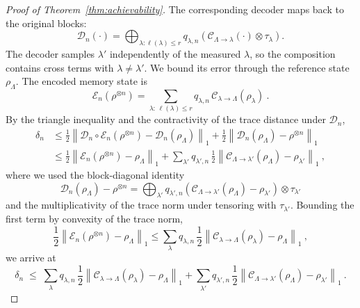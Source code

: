 \documentclass[a4paper,onecolumn,11pt]{quantumarticle}
\def\map{\mathcal}
\begin{document}
\begin{proof}[Proof of Theorem~\ref{thm:achievability}]
The corresponding decoder maps back to the original blocks:
\begin{equation}\label{eq:optimal_decoder}
    \map{D}_n(\cdot) = \bigoplus_{\lambda : \ell(\lambda) \le r}
    q_{\lambda,n}\left(\map{C}_{\Lambda\to \lambda}(\cdot)
    \otimes\tau_\lambda\right).
\end{equation}
The decoder samples $\lambda'$ independently of the measured $\lambda$,
so the composition contains cross terms with $\lambda\ne\lambda'$.
We bound its error through the reference state $\rho_{\Lambda}$.
The encoded memory state is
\begin{equation}
    \map E_n(\rho^{\otimes n})=\sum_{\lambda:\,\ell(\lambda)\le r} q_{\lambda,n}\,\map C_{\lambda\to\Lambda}(\rho_\lambda)\ .
\end{equation}
By the triangle inequality and the contractivity of the trace distance under $\map D_n$,
\begin{equation}
\begin{aligned}
    \delta_n &\le \frac12\left\|\map D_n\circ\map E_n(\rho^{\otimes n})-\map D_n(\rho_{\Lambda})\right\|_1 + \frac12\left\|\map D_n(\rho_{\Lambda})-\rho^{\otimes n}\right\|_1\\
    &\le \frac12\left\|\map E_n(\rho^{\otimes n})-\rho_{\Lambda}\right\|_1 + \sum_{\lambda'}q_{\lambda',n}\,\frac12\left\|\map C_{\Lambda\to\lambda'}(\rho_{\Lambda})-\rho_{\lambda'}\right\|_1\ ,
\end{aligned}
\end{equation}
where we used the block-diagonal identity
\[
\map D_n(\rho_{\Lambda})-\rho^{\otimes n}
=\bigoplus_{\lambda'}q_{\lambda',n}
\left(\map C_{\Lambda\to\lambda'}(\rho_{\Lambda})
-\rho_{\lambda'}\right)\otimes\tau_{\lambda'}
\]
and the multiplicativity of the trace norm under tensoring with $\tau_{\lambda'}$. Bounding the first term by convexity of the trace norm,
\begin{equation}
    \frac12\left\|\map E_n(\rho^{\otimes n})-\rho_{\Lambda}\right\|_1\le \sum_{\lambda}q_{\lambda,n}\,\frac12\left\|\map C_{\lambda\to\Lambda}(\rho_\lambda)-\rho_{\Lambda}\right\|_1\ ,
\end{equation}
we arrive at
\begin{equation}\label{eq:error_triangle}
    \delta_n\;\le\;\sum_{\lambda}q_{\lambda,n}\,\frac12\left\|\map C_{\lambda\to \Lambda}(\rho_\lambda)-\rho_{\Lambda}\right\|_1
    +\sum_{\lambda'}q_{\lambda',n}\,\frac12\left\|\map C_{\Lambda\to \lambda'}(\rho_{\Lambda})-\rho_{\lambda'}\right\|_1\ .
\end{equation}

\end{proof}
\end{document}
